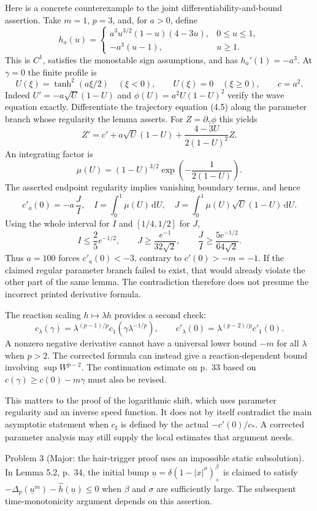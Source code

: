 \documentclass[10pt]{article}
\begin{document}
Here is a concrete counterexample to the joint differentiability-and-bound assertion. Take \(m=1\), \(p=3\), and, for \(a>0\), define \[h_a(u)=
 \begin{cases}
 a^3u^{3/2}(1-u)(4-3u),&0\leq u\leq1,\\
 -a^3(u-1),&u\geq1.
 \end{cases}\] This is \(C^1\), satisfies the monostable sign assumptions, and has \(h_a'(1)=-a^3\). At \(\gamma=0\) the finite profile is \[U(\xi)=\tanh^2(a\xi/2)\quad(\xi<0),\qquad
 U(\xi)=0\quad(\xi\geq0),\qquad c=a^2.\] Indeed \(U'=-a\sqrt U(1-U)\) and \(\phi(U)=a^2U(1-U)^2\) verify the wave equation exactly. Differentiate the trajectory equation (4.5) along the parameter branch whose regularity the lemma asserts. For \(Z=\partial_\gamma\phi\) this yields \[Z'=c'+a\sqrt U(1-U)
          +\frac{4-3U}{2(1-U)^2}Z .\] An integrating factor is \[\mu(U)=(1-U)^{3/2}
                  \exp\!\left(-\frac1{2(1-U)}\right).\] The asserted endpoint regularity implies vanishing boundary terms, and hence \[c'_a(0)=-a\,\frac{J}{I},\quad
 I=\int_0^1\mu(U)\,\mathrm dU,\quad
 J=\int_0^1\mu(U)\sqrt U(1-U)\,\mathrm dU.\] Using the whole interval for \(I\) and \([1/4,1/2]\) for \(J\), \[I\leq\frac25 e^{-1/2},\qquad
 J\geq\frac{e^{-1}}{32\sqrt2},\qquad
 \frac{J}{I}\geq\frac{5e^{-1/2}}{64\sqrt2}.\] Thus \(a=100\) forces \(c'_a(0)<-3\), contrary to \(c'(0)>-m=-1\). If the claimed regular parameter branch failed to exist, that would already violate the other part of the same lemma. The contradiction therefore does not presume the incorrect printed derivative formula.\par
The reaction scaling \(h\mapsto\lambda h\) provides a second check: \[c_\lambda(\gamma)=
 \lambda^{(p-1)/p}c_1(\gamma\lambda^{-1/p}),\qquad
 c'_\lambda(0)=\lambda^{(p-2)/p}c'_1(0).\] A nonzero negative derivative cannot have a universal lower bound \(-m\) for all \(\lambda\) when \(p>2\). The corrected formula can instead give a reaction-dependent bound involving \(\sup W^{p-2}\). The continuation estimate on p. 33 based on \(c(\gamma)\geq c(0)-m\gamma\) must also be revised.\par
This matters to the proof of the logarithmic shift, which uses parameter regularity and an inverse speed function. It does not by itself contradict the main asymptotic statement when \(c_\sharp\) is defined by the actual \(-c'(0)/c_*\). A corrected parameter analysis may still supply the local estimates that argument needs.\par
Problem 3 (Major: the hair-trigger proof uses an impossible static subsolution).  In Lemma 5.2, p. 34, the initial bump \(\underline u=\delta(1-|x|^\sigma)_+^\beta\) is claimed to satisfy \(-\Delta_p(\underline u^m)-\widehat h(\underline u)\leq0\) when \(\beta\) and \(\sigma\) are sufficiently large. The subsequent time-monotonicity argument depends on this assertion.\par
\end{document}
